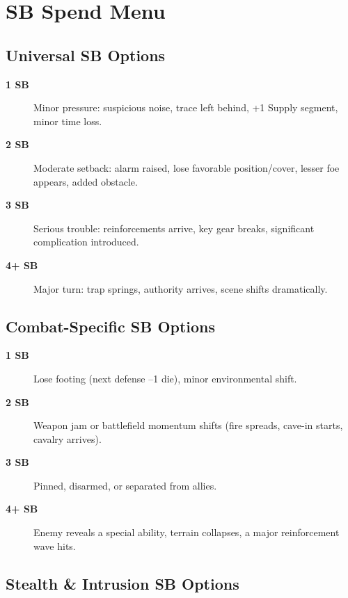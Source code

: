 \section{SB Spend Menu}
\label{sec:sb-spend-menu}

\subsection{Universal SB Options}
\label{subsec:universal-sb}

\begin{description}
\item[\textbf{1 SB}] Minor pressure: suspicious noise, trace left behind, +1 Supply segment, minor time loss. 
\item[\textbf{2 SB}] Moderate setback: alarm raised, lose favorable position/cover, lesser foe appears, added obstacle. 
\item[\textbf{3 SB}] Serious trouble: reinforcements arrive, key gear breaks, significant complication introduced. 
\item[\textbf{4+ SB}] Major turn: trap springs, authority arrives, scene shifts dramatically. 
\end{description}

\subsection{Combat-Specific SB Options}
\label{subsec:combat-sb}

\begin{description}
\item[\textbf{1 SB}] Lose footing (next defense –1 die), minor environmental shift.
\item[\textbf{2 SB}] Weapon jam or battlefield momentum shifts (fire spreads, cave-in starts, cavalry arrives).
\item[\textbf{3 SB}] Pinned, disarmed, or separated from allies.
\item[\textbf{4+ SB}] Enemy reveals a special ability, terrain collapses, a major reinforcement wave hits.
\end{description}

\subsection{Stealth \& Intrusion SB Options}
\label{subsec:stealth-sb}

